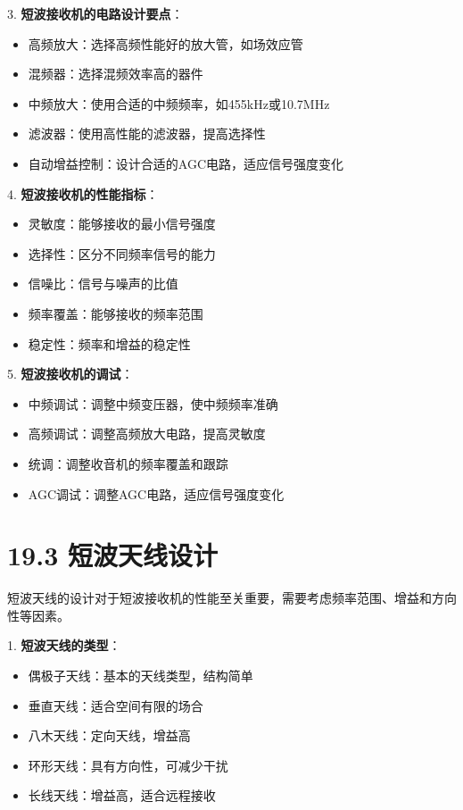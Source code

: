 \documentclass[12pt,UTF8]{ctexbook}
\begin{document}
3. \textbf{短波接收机的电路设计要点}：
   \begin{itemize}[leftmargin=3.5em]
   \item 高频放大：选择高频性能好的放大管，如场效应管
   \item 混频器：选择混频效率高的器件
   \item 中频放大：使用合适的中频频率，如455kHz或10.7MHz
   \item 滤波器：使用高性能的滤波器，提高选择性
   \item 自动增益控制：设计合适的AGC电路，适应信号强度变化
   \end{itemize}

4. \textbf{短波接收机的性能指标}：
   \begin{itemize}[leftmargin=3.5em]
   \item 灵敏度：能够接收的最小信号强度
   \item 选择性：区分不同频率信号的能力
   \item 信噪比：信号与噪声的比值
   \item 频率覆盖：能够接收的频率范围
   \item 稳定性：频率和增益的稳定性
   \end{itemize}

5. \textbf{短波接收机的调试}：
   \begin{itemize}[leftmargin=3.5em]
   \item 中频调试：调整中频变压器，使中频频率准确
   \item 高频调试：调整高频放大电路，提高灵敏度
   \item 统调：调整收音机的频率覆盖和跟踪
   \item AGC调试：调整AGC电路，适应信号强度变化
   \end{itemize}

\section*{19.3 短波天线设计}

短波天线的设计对于短波接收机的性能至关重要，需要考虑频率范围、增益和方向性等因素。

1. \textbf{短波天线的类型}：
   \begin{itemize}[leftmargin=3.5em]
   \item 偶极子天线：基本的天线类型，结构简单
   \item 垂直天线：适合空间有限的场合
   \item 八木天线：定向天线，增益高
   \item 环形天线：具有方向性，可减少干扰
   \item 长线天线：增益高，适合远程接收
   \end{itemize}
\end{document}
